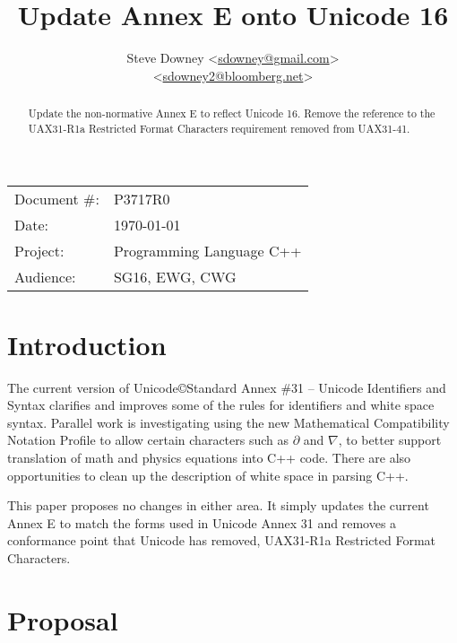 \documentclass[a4paper,10pt,oneside,openany,final,article]{memoir}
\begin{document}
\title{Update Annex E onto Unicode 16}
\author{
  Steve Downey \small<\href{mailto:sdowney@gmail.com}{sdowney@gmail.com}> \\
  \small<\href{mailto:sdowney2@bloomberg.net}{sdowney2@bloomberg.net}> \\
}
\date{} %
\maketitle

\begin{flushright}
  \begin{tabular}{ll}
    Document \#: & P3717R0 \\
    Date: & \today \\
    Project: & Programming Language C++ \\
    Audience: & SG16, EWG, CWG
  \end{tabular}
\end{flushright}

\begin{abstract}
  Update the non-normative Annex E to reflect Unicode 16.
  Remove the reference to the UAX31-R1a Restricted Format Characters requirement removed from UAX31-41.
\end{abstract}

\tableofcontents*


\chapter{Introduction}
The current version of Unicode\copyright Standard Annex \#31 -- Unicode Identifiers and Syntax clarifies and improves some of the rules for identifiers and white space syntax. Parallel work is investigating using the new Mathematical Compatibility Notation Profile to allow certain characters such as $\partial$ and $\nabla$, to better support translation of math and physics equations into C++ code. There are also opportunities to clean up the description of white space in parsing C++.

This paper proposes no changes in either area. It simply updates the current Annex E to match the forms used in Unicode Annex 31 and removes a conformance point that Unicode has removed, UAX31-R1a Restricted Format Characters.

\chapter{Proposal}
\end{document}
